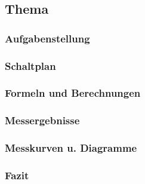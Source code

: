 \newpage
\subsection{Thema}
\subsubsection{Aufgabenstellung}
\subsubsection{Schaltplan}
\subsubsection{Formeln und Berechnungen}
\subsubsection{Messergebnisse}
\subsubsection{Messkurven u. Diagramme}
\subsubsection{Fazit}
